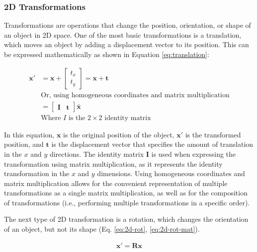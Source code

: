 \subsubsection{2D Transformations}
\label{sec:2d-transformations}
Transformations are operations that change the position, orientation, or shape of an object in 2D space. One of the most basic transformations is a translation, which moves an object by adding a displacement vector to its position. This can be expressed mathematically as shown in Equation \ref{eq:translation}:

\begin{equation}
    \begin{aligned}
        \mathbf{x'} &= \mathbf{x} + \begin{bmatrix}
            t_x \\ t_y
        \end{bmatrix} = \mathbf{x} + \mathbf{t}\\
        &\text{Or, using homogeneous coordinates and matrix multiplication} \\
        &= \begin{bmatrix}
            \mathbf{I} & \mathbf{t}
        \end{bmatrix}\bar{\mathbf{x}} \\
        &\text{Where $I$ is the $2 \times 2$ identity matrix}
    \end{aligned}
    \label{eq:translation}
\end{equation}

In this equation, $\mathbf{x}$ is the original position of the object, $\mathbf{x'}$ is the transformed position, and $\mathbf{t}$ is the displacement vector that specifies the amount of translation in the $x$ and $y$ directions. The identity matrix $\mathbf{I}$ is used when expressing the transformation using matrix multiplication, as it represents the identity transformation in the $x$ and $y$ dimensions. Using homogeneous coordinates and matrix multiplication allows for the convenient representation of multiple transformations as a single matrix multiplication, as well as for the composition of transformations (i.e., performing multiple transformations in a specific order).

The next type of 2D transformation is a rotation, which changes the orientation of an object, but not its shape (Eq. \ref{eq:2d-rot}, \ref{eq:2d-rot-mat}). 

\begin{equation}
    \begin{aligned}
        \mathbf{x}' = \mathbf{Rx}
    \end{aligned}
    \label{eq:2d-rot}
\end{equation}

